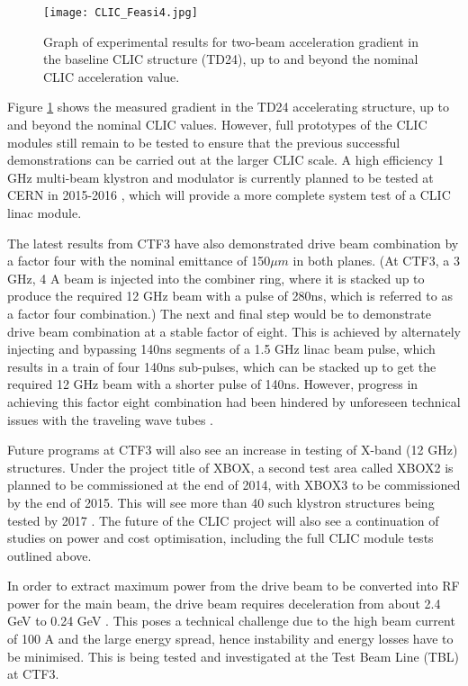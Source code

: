 \begin{figure}[!htb]
    \centering
    \texttt{[image: CLIC\_Feasi4.jpg]}
    
    \caption{Graph of experimental results for two-beam acceleration gradient in the baseline CLIC structure (TD24), up to and beyond the nominal CLIC acceleration value. \cite{ICFA:BeamDynPress}}
    \label{fig:CLIC:Feasi4}
\end{figure}

Figure \ref{fig:CLIC:Feasi4} shows the measured gradient in the TD24 accelerating structure, up to and beyond the nominal CLIC values. However, full prototypes of the CLIC modules still remain to be tested to ensure that the previous successful demonstrations can be carried out at the larger CLIC scale. A high efficiency 1 GHz multi-beam klystron and modulator is currently planned to be tested at CERN in 2015-2016 \cite{ICFA:BeamDynPress}, which will provide a more complete system test of a CLIC linac module.

The latest results from CTF3 have also demonstrated drive beam combination by a factor four with the nominal emittance of 150$\mu m$ in both planes. (At CTF3, a 3 GHz, 4 A beam is injected into the combiner ring, where it is stacked up to produce the required 12 GHz beam with a pulse of 280ns, which is referred to as a factor four combination.) The next and final step would be to demonstrate drive beam combination at a stable factor of eight. This is achieved by alternately injecting and bypassing 140ns segments of a 1.5 GHz linac beam pulse, which results in a train of four 140ns sub-pulses, which can be stacked up to get the required 12 GHz beam with a shorter pulse of 140ns. However, progress in achieving this factor eight combination had been hindered by unforeseen technical issues with the traveling wave tubes \cite{CLIC:Concept}.

Future programs at CTF3 will also see an increase in testing of X-band (12 GHz) structures. Under the project title of XBOX, a second test area called XBOX2 is planned to be commissioned at the end of 2014, with XBOX3 to be commissioned by the end of 2015. This will see more than 40 such klystron structures being tested by 2017 \cite{ICFA:BeamDynPress}. The future of the CLIC project will also see a continuation of studies on power and cost optimisation, including the full CLIC module tests outlined above.

In order to extract maximum power from the drive beam to be converted into RF power for the main beam, the drive beam requires deceleration from about 2.4 GeV to 0.24 GeV \cite{CLIC:Concept}. This poses a technical challenge due to the high beam current of 100 A and the large energy spread, hence instability and energy losses have to be minimised. This is being tested and investigated at the Test Beam Line (TBL) at CTF3.

